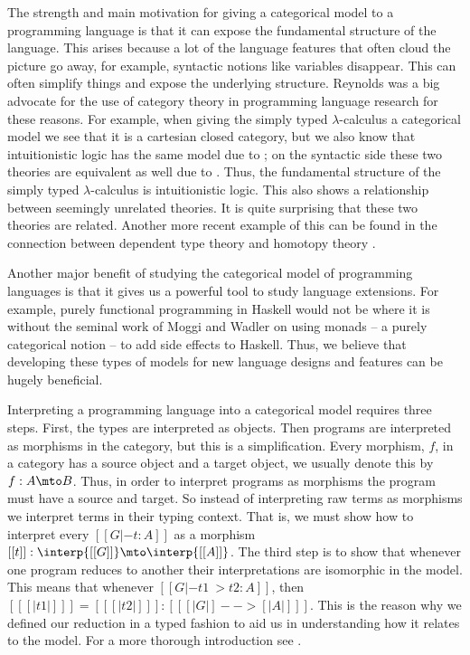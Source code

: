 The strength and main motivation for giving a categorical model to a
programming language is that it can expose the fundamental structure
of the language.  This arises because a lot of the language features
that often cloud the picture go away, for example, syntactic notions
like variables disappear.  This can often simplify things and expose
the underlying structure.  Reynolds \cite{?} was a big advocate for
the use of category theory in programming language research for these
reasons.  For example, when giving the simply typed $\lambda$-calculus
a categorical model we see that it is a cartesian closed category, but
we also know that intuitionistic logic has the same model due to
\cite{Lambek:1980}; on the syntactic side these two theories are
equivalent as well due to \cite{Howard:1980}. Thus, the fundamental
structure of the simply typed $\lambda$-calculus is intuitionistic
logic.  This also shows a relationship between seemingly unrelated
theories.  It is quite surprising that these two theories are related.
Another more recent example of this can be found in the connection
between dependent type theory and homotopy theory \cite{??}.

Another major benefit of studying the categorical model of programming
languages is that it gives us a powerful tool to study language
extensions.  For example, purely functional programming in Haskell
would not be where it is without the seminal work of Moggi and Wadler
\cite{??}  on using monads -- a purely categorical notion -- to add
side effects to Haskell.  Thus, we believe that developing these types
of models for new language designs and features can be hugely
beneficial.

Interpreting a programming language into a categorical model requires
three steps.  First, the types are interpreted as objects.  Then
programs are interpreted as morphisms in the category, but this is a
simplification.  Every morphism, $f$, in a category has a source
object and a target object, we usually denote this by $f : A \mto B$.
Thus, in order to interpret programs as morphisms the program must
have a source and target.  So instead of interpreting raw terms as
morphisms we interpret terms in their typing context.  That is, we
must show how to interpret every $[[G |- t : A]]$ as a morphism $[[t]]
: \interp{[[G]]} \mto \interp{[[A]]}$.  The third step is to show that
whenever one program reduces to another their interpretations are
isomorphic in the model. This means that whenever $[[G |- t1 ~> t2 :
    A]]$, then $[[ [|t1|] ]] = [[ [|t2|] ]] : [[ [| G |] --> [| A
      |] ]]$.  This is the reason why we defined our reduction in a
typed fashion to aid us in understanding how it relates to the model.
For a more thorough introduction see \cite{Crole:1994}.


